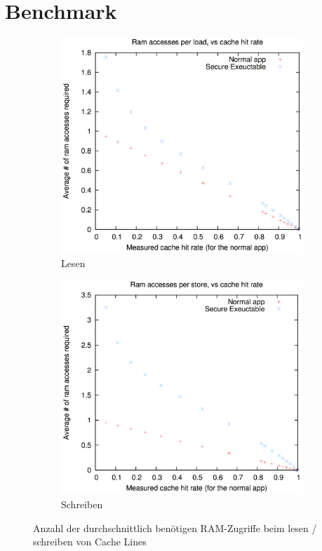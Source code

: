 \documentclass[ngerman]{sig-alternate-05-2015}
\begin{document}
\section{Benchmark}
\begin{figure}
	\centering
	\begin{subfigure}[b]{0.48\columnwidth}
		\includegraphics[width=\columnwidth]{bench_per_load2}
		\caption{Lesen}
		\label{fig:bench_load}
	\end{subfigure}
	\hfill
	\begin{subfigure}[b]{0.48\columnwidth}
		\includegraphics[width=\columnwidth]{bench_per_store2}
		\caption{Schreiben}
		\label{fig:bench_store}
	\end{subfigure}
	\caption{Anzahl der durchschnittlich benötigen RAM-Zugriffe beim lesen / schreiben von Cache Lines\cite{boivie2013secureblue++:big}}
	\label{fig:bench}
\end{figure}
\end{document}
